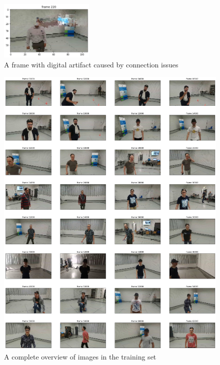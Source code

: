\begin{figure}[!htb]
	\centering
	\includegraphics[width=0.4\textwidth]{"contents/images/03-data-glitch"}
	\caption[A frame with digital artifact caused by connection issues]{A frame with digital artifact caused by connection issues}
	\label{fig:proximitynet-dataset-glitch}
\end{figure}

\clearpage
\vspace*{5ex}
\begin{figure}[!h]
	\centering
	\includegraphics[width=1\textwidth]{"contents/images/03-data-overview"}
	\caption[A complete overview of images in the training set]{A complete overview of images in the training set}
	\label{fig:proximitynet-dataset-overview}
\end{figure}
\clearpage

